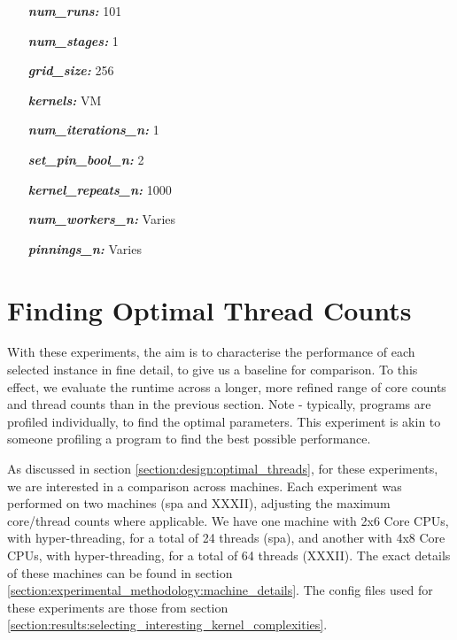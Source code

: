 \begin{itemize}
    \begin{itemize}
        \item[\textit{\textbf{num\_runs:}}] 101
        
        \item[\textit{\textbf{num\_stages:}}] 1
        
        \item[\textit{\textbf{grid\_size:}}] 256
        
        \item[\textit{\textbf{kernels:}}] VM
        
        \item[\textit{\textbf{num\_iterations\_n:}}] 1
        
        \item[\textit{\textbf{set\_pin\_bool\_n:}}] 2
        
        \item[\textit{\textbf{kernel\_repeats\_n:}}] 1000
        
        \item[\textit{\textbf{num\_workers\_n:}}] Varies
        
        \item[\textit{\textbf{pinnings\_n:}}] Varies
    \end{itemize}
\end{itemize}



\section{Finding Optimal Thread Counts}
\label{section:results:finding_optimal_thread_counts}

With these experiments, the aim is to characterise the performance of each selected instance in fine detail, to give us a baseline for comparison. To this effect, we evaluate the runtime across a longer, more refined range of core counts and thread counts than in the previous section. Note - typically, programs are profiled individually, to find the optimal parameters. This experiment is akin to someone profiling a program to find the best possible performance.

As discussed in section \ref{section:design:optimal_threads}, for these experiments, we are interested in a comparison across machines. Each experiment was performed on two machines (spa and XXXII), adjusting the maximum core/thread counts where applicable. We have one machine with 2x6 Core CPUs, with hyper-threading, for a total of 24 threads (spa), and another with 4x8 Core CPUs, with hyper-threading, for a total of 64 threads (XXXII). The exact details of these machines can be found in section \ref{section:experimental_methodology:machine_details}. The config files used for these experiments are those from section \ref{section:results:selecting_interesting_kernel_complexities}.



